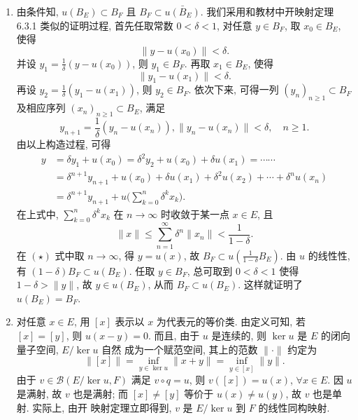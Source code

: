 \begin{enumerate}
\begin{answer}
\begin{enumerate}
        \item 由条件知, $u(B_{E})\subset B_{F}$ 且 $B_{F}\subset\bar{u\left(B_{E}\right)}$. 
        我们采用和教材中开映射定理 6.3.1 类似的证明过程, 首先任取常数 $0<\delta<1$, 对任意 $y\in B_{F}$, 取 $x_0\in B_{E}$, 使得
        \[
        \|y-u(x_0)\|<\delta.
        \] 
        并设 $y_{1}=\frac{1}{\delta}(y-u(x_{0}))$, 则 $y_1\in B_F$. 再取 $x_1\in B_E$, 使得
        \[
        \|y_{1}-u(x_{1})\|<\delta .
        \]
        再设 $y_2=\frac{1}{\delta}(y_1-u(x_1))$, 则 $y_2\in B_F$. 依次下来, 
        可得一列 $(y_n)_{n\geq 1}\subset B_F$ 及相应序列 $(x_n)_{n\geq 1}\subset B_E$, 满足
        \[
        y_{n+1}=\frac{1}{\delta}(y_n-u(x_n)),\|y_{n}-u(x_{n})\|<\delta, \quad n\geq 1.
        \]
        由以上构造过程, 可得
        \begin{equation}
            \begin{aligned}
                y &=\delta y_{1}+u(x_{0})=\delta^{2} y_{2}+u(x_{0})+\delta u(x_{1})=\cdots \cdots \\
                &=\delta^{n+1} y_{n+1}+u(x_{0})+\delta u(x_{1})+\delta^{2} u(x_{2})+\cdots+\delta^{n} u(x_{n}) \\
                &=\delta^{n+1} y_{n+1}+u\biggl(\sum_{k=0}^{n} \delta^{k} x_{k}\biggr).
            \end{aligned}\tag{$\star$}
        \end{equation}
        在上式中, $\sum_{k=0}^n \delta^k x_k$ 在 $n\to\infty$ 时收敛于某一点 $x\in E$, 且
        \[\|x\|\leq\sum_{n=1}^{\infty}\delta^n\|x_n\|<\frac{1}{1-\delta}.\]
        在 $(\star)$ 式中取 $n\to\infty$, 得 $y=u(x)$, 故 $B_F\subset u(\frac{1}{1-\delta}B_E)$.
        由 $u$ 的线性性, 有 $(1-\delta)B_F\subset u(B_E)$.
        任取 $y\in B_F$, 总可取到 $0<\delta<1$ 使得 $1-\delta>\|y\|$, 故
        $y\in u(B_E)$, 从而 $B_F\subset u(B_E)$. 这样就证明了 $u(B_E)=B_F$.
    
        \item 对任意 $x\in E$, 用 $[x]$ 表示以 $x$ 为代表元的等价类. 由定义可知, 若 $[x]=[y]$, 则
        $u(x-y)=0$. 而且, 由于 $u$ 是连续的, 则 $\ker u$ 是 $E$ 的闭向量子空间, $E/\ker u$ 自然
        成为一个赋范空间, 其上的范数 $\|\cdot\|$ 约定为
        \[\|[x]\|=\inf_{y\in\ker u}\|x+y\|=\inf_{y\in[x]}\|y\|.\]
        由于 $v\in\mathcal{B}(E/\ker u, F)$ 满足 $v\circ q=u$, 则 $v([x])=u(x)$, $\forall x\in E$. 
        因 $u$ 是满射, 故 $v$ 也是满射; 而 $[x]\neq[y]$ 等价于 $u(x)\neq u(y)$, 故 $v$ 也是单射. 实际上, 由开
        映射定理立即得到, $v$ 是 $E/\ker u$ 到 $F$ 的线性同构映射.
    

\end{enumerate}
\end{answer}
\end{enumerate}
